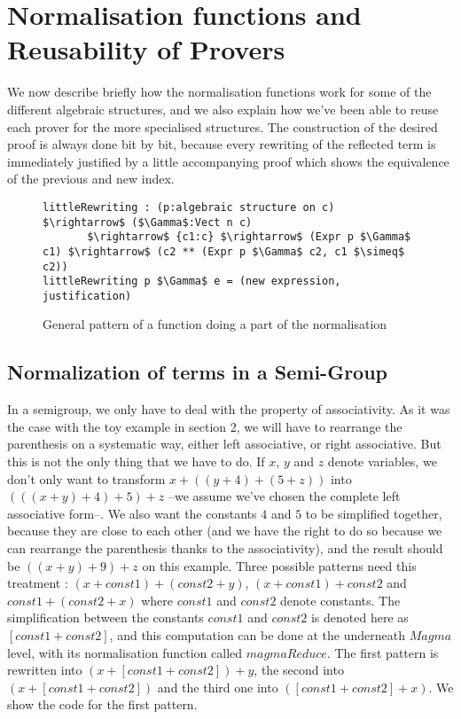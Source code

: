 \section{Normalisation functions and Reusability of Provers}

\label{sect:reuse}

We now describe briefly how the normalisation functions work for some of the different algebraic structures, and we also explain how we've been able to reuse each prover for the more specialised structures. The construction of the desired proof is always done bit by bit, because every rewriting of the reflected term is immediately justified by a little accompanying proof which shows the equivalence of the previous and new index.
\begin{figure}[H]
\figrule
\begin{center}
\begin{lstlisting}
littleRewriting : (p:algebraic structure on c) $\rightarrow$ ($\Gamma$:Vect n c) 
       $\rightarrow$ {c1:c} $\rightarrow$ (Expr p $\Gamma$ c1) $\rightarrow$ (c2 ** (Expr p $\Gamma$ c2, c1 $\simeq$ c2))
littleRewriting p $\Gamma$ e = (new expression, justification)
\end{lstlisting}
\end{center}
\caption{General pattern of a function doing a part of the normalisation}
\figrule
\end{figure}

	\subsection {Normalization of terms in a Semi-Group}
In a semigroup, we only have to deal with the property of associativity. As it was the case with the toy example in section 2, we will have to rearrange the parenthesis on a systematic way, either left associative, or right associative. But this is not the only thing that we have to do. If $x$, $y$ and $z$ denote variables, we don't only want to transform $x+((y+4)+(5+z))$ into $(((x+y)+4)+5)+z$ --we assume we've chosen the complete left associative form--. We also want the constants $4$ and $5$ to be simplified together, because they are close to each other (and we have the right to do so because we can rearrange the parenthesis thanks to the associativity), and the result should be $((x+y)+9)+z$ on this example. Three possible patterns need this treatment : $(x+const1)+(const2+y)$, $(x + const1) + const2$  and $const1 + (const2 + x)$ where $const1$ and $const2$ denote constants. The simplification between the constants $const1$ and $const2$ is denoted here as $[const1+const2]$, and this computation can be done at the underneath $Magma$ level, with its normalisation function called $magmaReduce$.
The first pattern is rewritten into $(x + [const1+const2]) + y$, the second into $(x + [const1+const2])$ and the third one into $([const1 + const2] + x)$.
We show the code for the first pattern.

